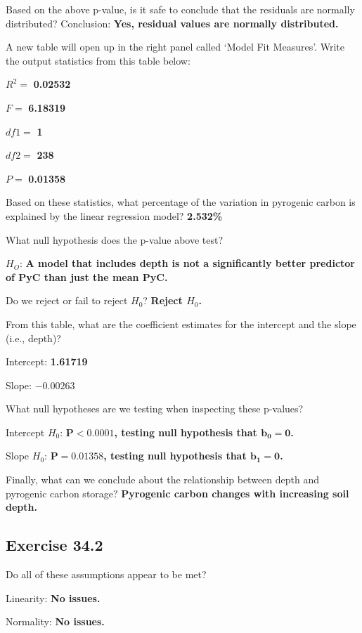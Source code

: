 \documentclass[
  openany]{krantz}
\begin{document}
Based on the above p-value, is it safe to conclude that the residuals are normally distributed? Conclusion: \textbf{Yes, residual values are normally distributed.}

A new table will open up in the right panel called `Model Fit Measures'. Write the output statistics from this table below:

\(R^{2} =\) \textbf{0.02532}

\(F =\) \textbf{6.18319}

\(df1 =\) \textbf{1}

\(df2 =\) \textbf{238}

\(P =\) \textbf{0.01358}

Based on these statistics, what percentage of the variation in pyrogenic carbon is explained by the linear regression model? \textbf{2.532\%}

What null hypothesis does the p-value above test?

\(H_{O}\): \textbf{A model that includes depth is not a significantly better predictor of PyC than just the mean PyC.}

Do we reject or fail to reject \(H_{0}\)? \textbf{Reject \(H_{0}\).}

From this table, what are the coefficient estimates for the intercept and the slope (i.e., depth)?

Intercept: \textbf{1.61719}

Slope: \textbf{\(\mathbf{-0.00263}\)}

What null hypotheses are we testing when inspecting these p-values?

Intercept \(H_{0}\): \textbf{\(\mathbf{P < 0.0001}\), testing null hypothesis that \(\mathbf{b_{0} = 0}\).}

Slope \(H_{0}\): \textbf{\(\mathbf{P = 0.01358}\), testing null hypothesis that \(\mathbf{b_{1} = 0}\).}

Finally, what can we conclude about the relationship between depth and pyrogenic carbon storage? \textbf{Pyrogenic carbon changes with increasing soil depth.}

\hypertarget{exercise-34.2}{%
\subsection{Exercise 34.2}\label{exercise-34.2}}

Do all of these assumptions appear to be met?

Linearity: \textbf{No issues.}

Normality: \textbf{No issues.}
\end{document}
